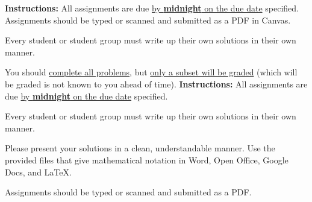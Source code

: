 

\extrawidth{0.5in} \extrafootheight{-0in} \pagestyle{headandfoot}
\headrule {} \footrule {}
\ifprintanswers
\noindent \textbf{Instructions:} All assignments are due \underline{by
\textbf{midnight} on the due date} specified.  Assignments should be typed or
scanned and submitted as a PDF in Canvas.

\medskip
\noindent Every student or student group must write up their own solutions in
their own manner.

\medskip
\noindent You should \underline{complete all problems}, but \underline{only a
subset will be graded} (which will be graded is not known to you ahead of
time).
\else
\noindent \textbf{Instructions:} All assignments are due \underline{by \textbf{midnight} on the due date} specified.

\medskip
\noindent Every student or student group  must write up their own solutions in
their own manner.

\medskip
\noindent Please present your solutions in a clean, understandable
manner.  Use the provided files that give mathematical notation in Word, Open Office, Google Docs, and \LaTeX.

\medskip
\noindent Assignments should be typed or scanned and submitted as a PDF.

